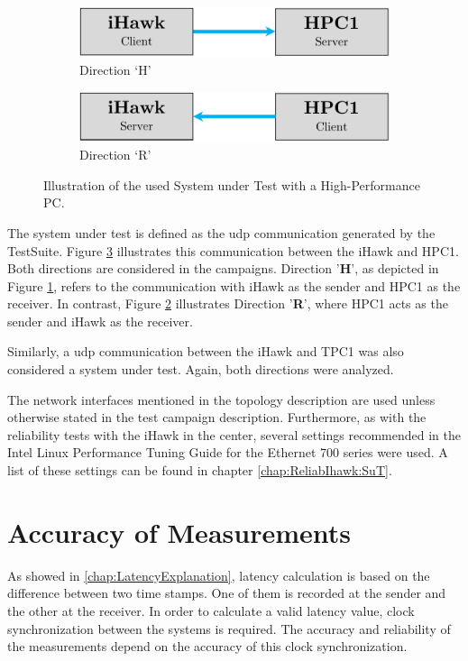 \begin{figure}[h]
    \centering
    \begin{subfigure}[b]{0.48\textwidth}
        \centering
        \includegraphics[width=\textwidth]{figures/performance/sut_1a.pdf}
        \caption{Direction `H'}
        \label{fig:SutHpcPerf:H}
    \end{subfigure}
    \hfill
    \begin{subfigure}[b]{0.48\textwidth}
        \centering
        \includegraphics[width=\textwidth]{figures/performance/sut_1b.pdf}
        \caption{Direction `R'}
        \label{fig:SutHpcPerf:R}
    \end{subfigure}
    \caption{Illustration of the used System under Test with a High-Performance PC.}
    \label{fig:SutHpcPerf}
\end{figure}

The system under test is defined as the \ac{udp} communication generated by the TestSuite. Figure  \ref{fig:SutHpcPerf} illustrates this communication between the iHawk and HPC1. Both directions are considered in the campaigns. Direction '\textbf{H}', as depicted in Figure \ref{fig:SutHpcPerf:H}, refers to the communication with iHawk as the sender and HPC1 as the receiver. In contrast, Figure \ref{fig:SutHpcPerf:R} illustrates Direction '\textbf{R}', where HPC1 acts as the sender and iHawk as the receiver.

Similarly, a \ac{udp} communication between the iHawk and TPC1 was also considered a system under test. Again, both directions were analyzed.

The network interfaces mentioned in the topology description are used unless otherwise stated in the test campaign description. Furthermore, as with the reliability tests with the iHawk in the center, several settings recommended in the Intel Linux Performance Tuning Guide for the Ethernet 700 series were used. A list of these settings can be found in chapter \ref{chap:ReliabIhawk:SuT}.

\section{Accuracy of Measurements}
As showed in \ref{chap:LatencyExplanation}, latency calculation is based on the difference between two time stamps. One of them is recorded at the sender and the other at the receiver. In order to calculate a valid latency value, clock synchronization between the systems is required. The accuracy and reliability of the measurements depend on the accuracy of this clock synchronization.

